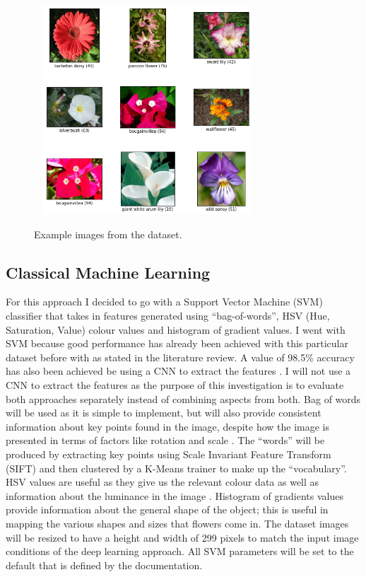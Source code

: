 \documentclass[12pt,a4paper]{report}
\begin{document}
\begin{figure}[h]\
    \centering
    \includegraphics[width=0.7\textwidth]{ox102examples.png}
    \caption{Example images from the dataset.}
    \label{fig:ox102}
\end{figure}

\subsection{Classical Machine Learning}

For this approach I decided to go with a Support Vector Machine (SVM) classifier that takes in features generated using 
“bag-of-words”, HSV (Hue, Saturation, Value) colour values and histogram of gradient values. I went with SVM because 
good performance has already been achieved with this particular dataset before with \citet{Nilsback2008} as 
stated in the 
literature review. A value of 98.5\% accuracy has also been achieved be using a CNN to extract the features 
\citep{mete}. I will not use a CNN to extract the features as the purpose of this investigation is to evaluate both 
approaches separately instead of combining aspects from both. Bag of words will be used as it is simple to implement, 
but will also provide consistent information about key points found in the image, despite how the image is presented in 
terms of factors like rotation and scale \citep{mohan}.
The “words” will be produced by extracting key points using Scale Invariant Feature
Transform (SIFT) and then clustered by a K-Means trainer to make up the “vocabulary”. HSV values are useful as they give
us the relevant colour data as well as information about the 
luminance in the image \citep{chapelle1999support}. Histogram of gradients values provide information about the general
shape of 
the object; this is useful in mapping the various shapes and sizes that flowers come in. The dataset images will be resized to have a height and width of 
299 pixels to match the input image conditions of the deep learning approach. All SVM parameters will be set to the 
default that is defined by the documentation.
\end{document}
